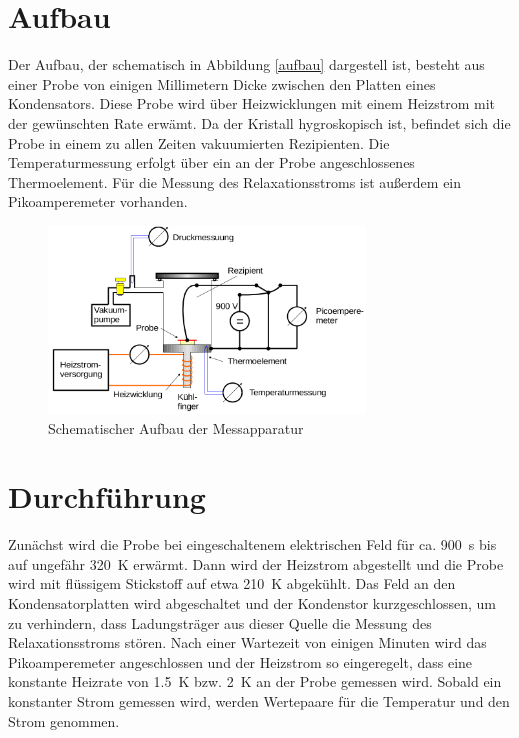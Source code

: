 \section{Aufbau}

Der Aufbau, der schematisch in Abbildung \autoref{aufbau} dargestell ist, besteht aus einer Probe von einigen Millimetern Dicke zwischen den Platten eines Kondensators. Diese Probe wird über Heizwicklungen mit einem Heizstrom mit der gewünschten Rate erwämt. Da der Kristall hygroskopisch ist, befindet sich die Probe in einem zu allen Zeiten vakuumierten Rezipienten. Die Temperaturmessung erfolgt über ein an der Probe angeschlossenes Thermoelement. Für die Messung des Relaxationsstroms ist außerdem ein Pikoamperemeter vorhanden.
\begin{figure}
  \centering
  \includegraphics[width=0.75\textwidth]{img/aufbau.png}
  \caption{Schematischer Aufbau der Messapparatur \cite{FP}}
  \label{aufbau}
\end{figure}

\FloatBarrier

\section{Durchf\"{u}hrung}

Zunächst wird die Probe bei eingeschaltenem elektrischen Feld für ca. \SI{900}{\second} bis auf ungefähr \SI{320}{\kelvin} erwärmt. Dann wird der Heizstrom abgestellt und die Probe wird mit flüssigem Stickstoff auf etwa \SI{210}{\kelvin} abgekühlt. Das Feld an den Kondensatorplatten wird abgeschaltet und der Kondenstor kurzgeschlossen, um zu verhindern, dass Ladungsträger aus dieser Quelle die Messung des Relaxationsstroms stören. Nach einer Wartezeit von einigen Minuten wird das Pikoamperemeter angeschlossen und der Heizstrom so eingeregelt, dass eine konstante Heizrate von \SI{1.5}{\kelvin} bzw. \SI{2}{\kelvin} an der Probe gemessen wird. Sobald ein konstanter Strom gemessen wird, werden Wertepaare für die Temperatur und den Strom genommen.

